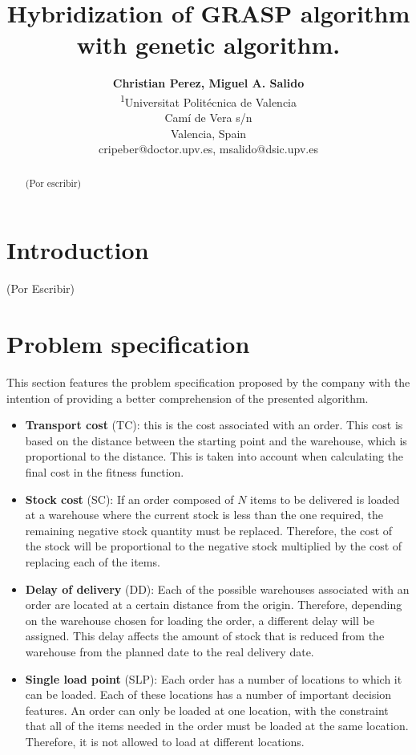 \documentclass[letterpaper]{article} %
\title{Hybridization of GRASP algorithm with genetic algorithm.}
\author{\Large \textbf{Christian Perez, Miguel A. Salido}\\ %
\textsuperscript{\rm 1}Universitat Politécnica de Valencia\\
Camí de Vera s/n\\
Valencia, Spain\\
cripeber@doctor.upv.es, msalido@dsic.upv.es %
}
\begin{document}
 \maketitle


\begin{abstract}
    (Por escribir)
\end{abstract}
\section*{Introduction}

(Por Escribir)


\section*{Problem specification}

This section features the problem specification proposed by the company with the intention of providing a better comprehension of the presented algorithm.

\begin{itemize}
  \item \textbf{Transport cost }(TC): this is the cost associated with an order. This cost is based on the distance between the starting point and the warehouse, which is proportional to the distance. This is taken into account when calculating the final cost in the fitness function.
  \item \textbf{Stock cost }(SC): If an order composed of $N$ items to be delivered is loaded at a warehouse where the current stock is less than the one required, the remaining negative stock quantity must be replaced. Therefore, the cost of the stock will be proportional to the negative stock multiplied by the cost of replacing each of the items.
  \item \textbf{Delay of delivery }(DD): Each of the possible warehouses associated with an order are located at a certain distance from the origin. Therefore, depending on the warehouse chosen for loading the order, a different delay will be assigned. This delay affects the amount of stock that is reduced from the warehouse from the planned date to the real delivery date.
  \item \textbf{Single load point }(SLP): Each order has a number of locations to which it can be loaded. Each of these locations has a number of important decision features. An order can only be loaded at one location, with the constraint that all of the items needed in the order must be loaded at the same location. Therefore, it is not allowed to load at different locations.
\end{itemize}
\end{document}
